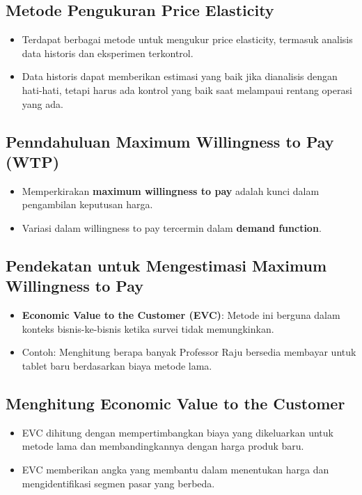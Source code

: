 \documentclass{article}
\begin{document}
\subsection{Metode Pengukuran Price Elasticity}
\begin{itemize}
    \item Terdapat berbagai metode untuk mengukur price elasticity, termasuk analisis data historis dan eksperimen terkontrol.
    \item Data historis dapat memberikan estimasi yang baik jika dianalisis dengan hati-hati, tetapi harus ada kontrol yang baik saat melampaui rentang operasi yang ada.
\end{itemize}

\subsection{Penndahuluan Maximum Willingness to Pay (WTP)}
\begin{itemize}
    \item Memperkirakan \textbf{maximum willingness to pay} adalah kunci dalam pengambilan keputusan harga.
    \item Variasi dalam willingness to pay tercermin dalam \textbf{demand function}.
\end{itemize}

\subsection{Pendekatan untuk Mengestimasi Maximum Willingness to Pay}
\begin{itemize}
    \item \textbf{Economic Value to the Customer (EVC)}: Metode ini berguna dalam konteks bisnis-ke-bisnis ketika survei tidak memungkinkan.
    \item Contoh: Menghitung berapa banyak Professor Raju bersedia membayar untuk tablet baru berdasarkan biaya metode lama.
\end{itemize}

\subsection{Menghitung Economic Value to the Customer}
\begin{itemize}
    \item EVC dihitung dengan mempertimbangkan biaya yang dikeluarkan untuk metode lama dan membandingkannya dengan harga produk baru.
    \item EVC memberikan angka yang membantu dalam menentukan harga dan mengidentifikasi segmen pasar yang berbeda.
\end{itemize}
\end{document}
